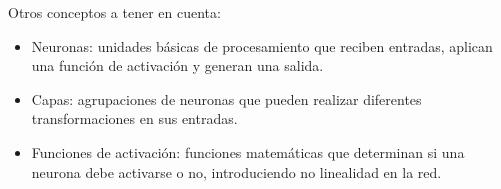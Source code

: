 Otros conceptos a tener en cuenta:
\begin{itemize}
    \item Neuronas: unidades básicas de procesamiento que reciben entradas, aplican una función de activación y generan una salida.
    \item Capas: agrupaciones de neuronas que pueden realizar diferentes transformaciones en sus entradas.
    \item Funciones de activación: funciones matemáticas que determinan si una neurona debe activarse o no, introduciendo no linealidad en la red.
\end{itemize}